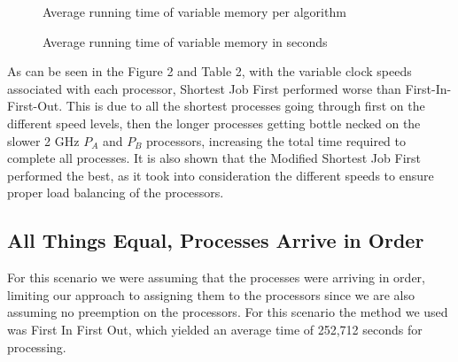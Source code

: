 \documentclass[12pt]{article}
\begin{document}
  \begin{figure}[h!]\CenterFloatBoxes
  \begin{floatrow}
    {\caption{Average running time of variable memory per algorithm}}
    \killfloatstyle{}
    {\caption{Average running time of variable memory in seconds}}
  \end{floatrow}
  \end{figure}

  As can be seen in the Figure 2 and Table 2, with the variable clock speeds associated with each processor, Shortest Job First performed worse than First-In-First-Out. This is due to all the shortest processes going through first on the different speed levels, then the longer processes getting bottle necked on the slower 2 GHz $P_A$ and $P_B$ processors, increasing the total time required to complete all processes. It is also shown that the Modified Shortest Job First performed the best, as it took into consideration the different speeds to ensure proper load balancing of the processors.

  \subsection{All Things Equal, Processes Arrive in Order}

  For this scenario we were assuming that the processes were arriving in order, limiting our approach to assigning them to the processors since we are also assuming no preemption on the processors. For this scenario the method we used was First In First Out, which yielded an average time of 252,712 seconds for processing.
\end{document}
